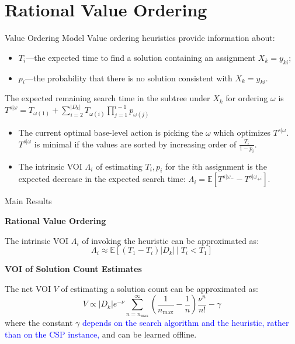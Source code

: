\documentclass{beamer}
\begin{document}
\section{Rational Value Ordering}

\begin{frame}{Value Ordering Model}
Value ordering heuristics provide information about:
\begin{itemize}
 \item $T_i$---the expected time to find a solution containing
          an assignment  $X_k=y_{ki};$
\item $p_i$---the probability that there is no solution
  consistent with $X_k=y_{ki}$.
\end{itemize}
The expected remaining search time in the subtree under $X_k$ for
ordering $\omega$ is $T^{s|\omega}=T_{\omega(1)}+\sum_{i=2}^{|D_k|}T_{\omega(i)}\prod_{j=1}^{i-1}p_{\omega(j)}$
\begin{itemize}
\item The current optimal base-level action is picking the $\omega $ which optimizes $T^{s|\omega}$.  $T^{s|\omega}$ is minimal if the values are sorted  by increasing order of $\frac {T_i} {1-p_i}$.
\item The intrinsic VOI $\Lambda_i$ of estimating $T_i, p_i$ for the $i$th assignment is the expected decrease in the expected search time:
          $\Lambda_i=\mathbb{E}\left[T^{s|\omega_-}-T^{s|\omega_{+i}}\right]$.
\end{itemize}
\end{frame}

\begin{frame}{Main Results}

{\large{\bf Rational Value Ordering}}

The intrinsic VOI $\Lambda_i$ of invoking the heuristic can be approximated as:
\[\Lambda_i\approx \mathbb{E}\left[(T_1-T_i)|D_k|\,\Big|\; T_i < T_1 \right]\]

{\large{\bf VOI of Solution Count Estimates}}

The net VOI $V$ of estimating a solution count can be approximated as:
\[V \propto |D_k|e^{-\nu}\sum_{n=n_\mathrm{max}}^\infty \! \! \left( \frac 1 {n_\mathrm{max}} - \frac 1 n\right) \frac {\nu^n} {n!}-\gamma\]
where the constant $\gamma$ \textcolor{blue}{depends on the search algorithm and the heuristic, rather than on the CSP instance,} and can be learned offline. 
\end{frame}
\end{document}
